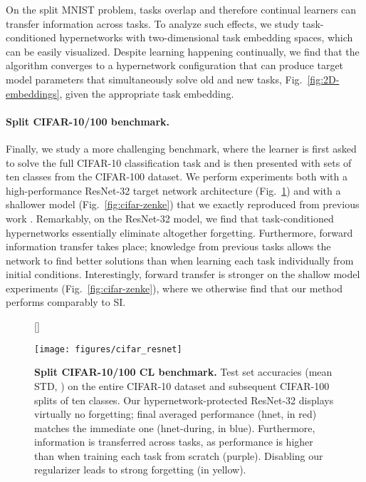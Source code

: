 \documentclass{article}
\begin{document}
On the split MNIST problem, tasks overlap and therefore continual learners can transfer information across tasks. To analyze such effects, we study task-conditioned hypernetworks with two-dimensional task embedding spaces, which can be easily visualized. Despite learning happening continually, we find that the algorithm converges to a hypernetwork configuration that can produce target model parameters that simultaneously solve old and new tasks, Fig.~\ref{fig:2D-embeddings}, given the appropriate task embedding.

\vspace{-2mm}
\paragraph{Split CIFAR-10/100 benchmark.} Finally, we study a more challenging benchmark, where the learner is first asked to solve the full CIFAR-10 classification task and is then presented with sets of ten classes from the CIFAR-100 dataset. We perform experiments both with a high-performance ResNet-32 target network architecture (Fig.~\ref{fig:cifar}) and with a shallower model (Fig.~\ref{fig:cifar-zenke}) that we exactly reproduced from previous work \citep{zenke_continual_2017}. Remarkably, on the ResNet-32 model, we find that task-conditioned hypernetworks essentially eliminate altogether forgetting. Furthermore, forward information transfer takes place; knowledge from previous tasks allows the network to find better solutions than when learning each task individually from initial conditions. Interestingly, forward transfer is stronger on the shallow model experiments (Fig.~\ref{fig:cifar-zenke}), where we otherwise find that our method performs comparably to SI.

\begin{figure}
    [\FBwidth]
    {\caption{\textbf{Split CIFAR-10/100 CL benchmark.} Test set accuracies (mean  STD, ) on the entire CIFAR-10 dataset and subsequent CIFAR-100 splits of ten classes. Our hypernetwork-protected ResNet-32 displays virtually no forgetting; final averaged performance (hnet, in red) matches the immediate one (hnet-during, in blue). Furthermore, information is transferred across tasks, as performance is higher than when training each task from scratch (purple). Disabling our regularizer leads to strong forgetting (in yellow).\label{fig:cifar}}}
    {\texttt{[image: figures/cifar\_resnet]}}
\end{figure}
\end{document}
